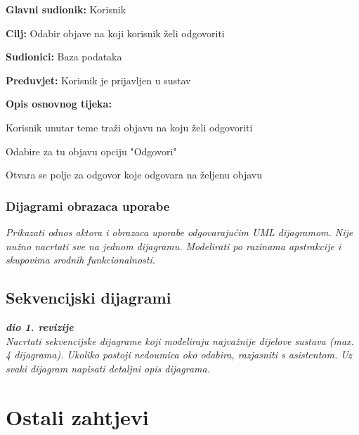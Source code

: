 					\begin{packed_item}
	
						\item \textbf{Glavni sudionik: }Korisnik
						\item  \textbf{Cilj:} Odabir objave na koji korisnik želi odgovoriti
						\item  \textbf{Sudionici:} Baza podataka
						\item  \textbf{Preduvjet:} Korisnik je prijavljen u sustav
						\item  \textbf{Opis osnovnog tijeka:}
						
						\item[] \begin{packed_enum}
	
							\item Korisnik unutar teme traži objavu na koju želi odgovoriti
							\item Odabire za tu objavu opciju "Odgovori"
							\item Otvara se polje za odgovor koje odgovara na željenu objavu
							
							
						\end{packed_enum}
						
						
					\end{packed_item}						
										
					
				\subsubsection{Dijagrami obrazaca uporabe}
					
					\textit{Prikazati odnos aktora i obrazaca uporabe odgovarajućim UML dijagramom. Nije nužno nacrtati sve na jednom dijagramu. Modelirati po razinama apstrakcije i skupovima srodnih funkcionalnosti.}
				\eject		
				
			\subsection{Sekvencijski dijagrami}
				
				\textbf{\textit{dio 1. revizije}}\\
				
				\textit{Nacrtati sekvencijske dijagrame koji modeliraju najvažnije dijelove sustava (max. 4 dijagrama). Ukoliko postoji nedoumica oko odabira, razjasniti s asistentom. Uz svaki dijagram napisati detaljni opis dijagrama.}
				\eject
	
		\section{Ostali zahtjevi}
		
